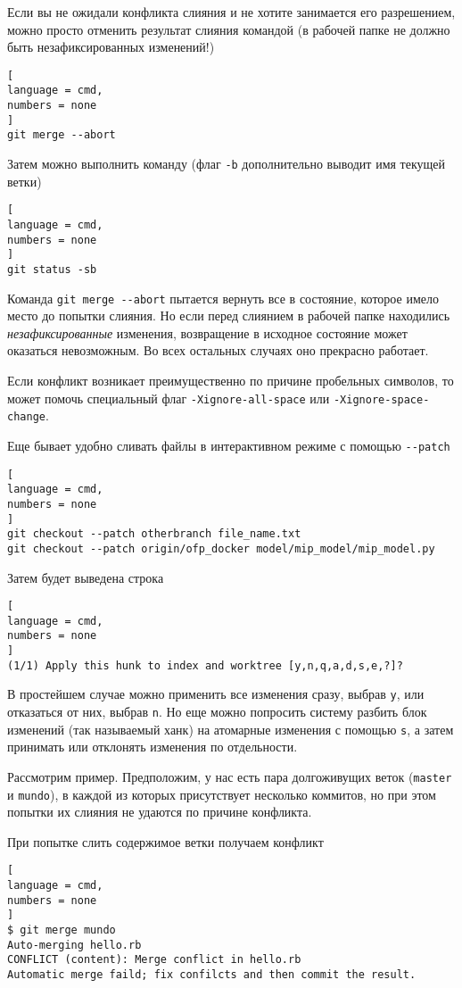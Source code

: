 \documentclass[%
	11pt,
	a4paper,
	utf8,
		]{article}
\begin{document}
Если вы не ожидали конфликта слияния и не хотите занимается его разрешением, можно просто отменить результат слияния командой (в рабочей папке не должно быть незафиксированных изменений!)
\begin{lstlisting}[
language = cmd,
numbers = none
]
git merge --abort
\end{lstlisting}

Затем можно выполнить команду (флаг \verb|-b| дополнительно выводит имя текущей ветки)
\begin{lstlisting}[
language = cmd,
numbers = none
]
git status -sb
\end{lstlisting}

Команда \verb|git merge --abort| пытается вернуть все в состояние, которое имело место до попытки слияния. Но если перед слиянием в рабочей папке находились \emph{незафиксированные} изменения, возвращение в исходное состояние может оказаться невозможным. Во всех остальных случаях оно прекрасно работает.

Если конфликт возникает преимущественно по причине пробельных символов, то может помочь специальный флаг \verb|-Xignore-all-space| или \verb|-Xignore-space-change|.

Еще бывает удобно сливать файлы в интерактивном режиме с помощью \verb|--patch|
\begin{lstlisting}[
language = cmd,
numbers = none
]
git checkout --patch otherbranch file_name.txt
git checkout --patch origin/ofp_docker model/mip_model/mip_model.py
\end{lstlisting}

Затем будет выведена строка
\begin{lstlisting}[
language = cmd,
numbers = none
]
(1/1) Apply this hunk to index and worktree [y,n,q,a,d,s,e,?]?
\end{lstlisting}

В простейшем случае можно применить все изменения сразу, выбрав \texttt{y}, или отказаться от них, выбрав \texttt{n}. Но еще можно попросить систему разбить блок изменений (так называемый ханк) на атомарные изменения с помощью \texttt{s}, а затем принимать или отклонять изменения по отдельности.

Рассмотрим пример. Предположим, у нас есть пара долгоживущих веток (\texttt{master} и \texttt{mundo}), в каждой из которых присутствует несколько коммитов, но при этом попытки их слияния не удаются по причине конфликта.

При попытке слить содержимое ветки получаем конфликт
\begin{lstlisting}[
language = cmd,
numbers = none
]
$ git merge mundo
Auto-merging hello.rb
CONFLICT (content): Merge conflict in hello.rb
Automatic merge faild; fix confilcts and then commit the result.
\end{lstlisting}
\end{document}
